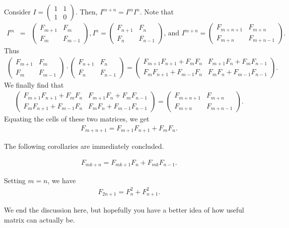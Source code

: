 \documentclass{subfile}
\begin{document}
\begin{solution}
Consider $I=\begin{pmatrix}
1 & 1\\
1 & 0
\end{pmatrix}$. Then, $I^{m+n}=I^mI^n$. Note that
\begin{eqnarray*}
I^m & = &
\begin{pmatrix}
F_{m+1} & F_m\\
F_m & F_{m-1}
\end{pmatrix}, 
I^n  = 
\begin{pmatrix}
F_{n+1} & F_n\\
F_n & F_{n-1}
\end{pmatrix} \text{, and }
 I^{m+n}  =
\begin{pmatrix}
F_{m+n+1} & F_{m+n}\\
F_{m+n} & F_{m+n-1}
\end{pmatrix}.
\end{eqnarray*}
Thus
\begin{align*}
\begin{pmatrix}
F_{m+1} & F_m\\
F_m & F_{m-1}
\end{pmatrix}
\cdot
\begin{pmatrix}
F_{n+1} & F_n\\
F_n & F_{n-1}
\end{pmatrix}=
\begin{pmatrix}
F_{m+1}F_{n+1}+F_mF_n & F_{m+1}F_n+F_mF_{n-1}\\
F_mF_{n+1}+F_{m-1}F_n & F_mF_n+F_{m-1}F_{n-1}
\end{pmatrix}.
\end{align*}
We finally find that
\begin{align*}
\begin{pmatrix}
F_{m+1}F_{n+1}+F_mF_n & F_{m+1}F_n+F_mF_{n-1}\\
F_mF_{n+1}+F_{m-1}F_n & F_mF_n+F_{m-1}F_{n-1}
\end{pmatrix}=
\begin{pmatrix}
F_{m+n+1} & F_{m+n}\\
F_{m+n} & F_{m+n-1}
\end{pmatrix}.
\end{align*}
Equating the cells of these two matrices, we get 
\begin{align*}
F_{m+n+1}=F_{m+1}F_{n+1}+F_mF_n.
\end{align*}
\end{solution}

The following corollaries are immediately concluded.

\begin{corollary}
\begin{align*}
F_{mk+n}=F_{mk+1}F_n+F_{mk}F_{n-1}.
\end{align*}
\end{corollary}

\begin{corollary}
Setting $m=n$, we have
\begin{align*}
F_{2n+1}=F_n^2+F_{n+1}^2.
\end{align*}
\end{corollary}

We end the discussion here, but hopefully you have a better idea of how useful matrix can actually be.
\end{document}
